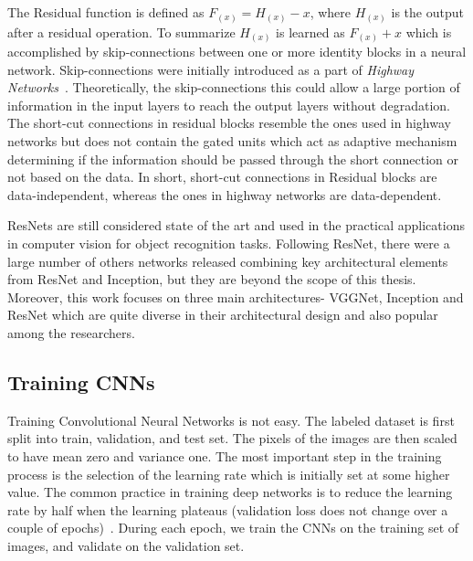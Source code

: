The Residual function is defined as $F_{(x)}=H_{(x)} - x$, where $H_{(x)}$ is the output after a residual operation. To summarize $H_{(x)}$ is learned as $F_{(x)} + x$ which is accomplished by skip-connections between one or more identity blocks in a neural network. Skip-connections were initially introduced as a part of \textit{Highway Networks}~\cite{HighWayNet}. Theoretically, the skip-connections this could allow a large portion of information in the input layers to reach the output layers without degradation. The short-cut connections in residual blocks resemble the ones used in highway networks but does not contain the gated units which act as adaptive mechanism determining if the information should be passed through the short connection or not based on the data. In short, short-cut connections in Residual blocks are data-independent, whereas the ones in highway networks are data-dependent.



ResNets are still considered state of the art and used in the practical applications in computer vision for object recognition tasks. Following ResNet, there were a large number of others networks released combining key architectural elements from ResNet and Inception, but they are beyond the scope of this thesis. Moreover, this work focuses on three main architectures- VGGNet, Inception and ResNet which are quite diverse in their architectural design and also popular among the researchers.

\subsection{Training CNNs}

Training Convolutional Neural Networks is not easy. The labeled dataset is first split into train, validation, and test set. The pixels of the images are then scaled to have mean zero and variance one.  The most important step in the training process is the selection of the learning rate which is initially set at some higher value. The common practice in training deep networks is to reduce the learning rate by half when the learning plateaus (validation loss does not change over a couple of epochs)~\cite{Goodfellow}. During each epoch, we train the CNNs on the training set of images, and validate on the validation set.

